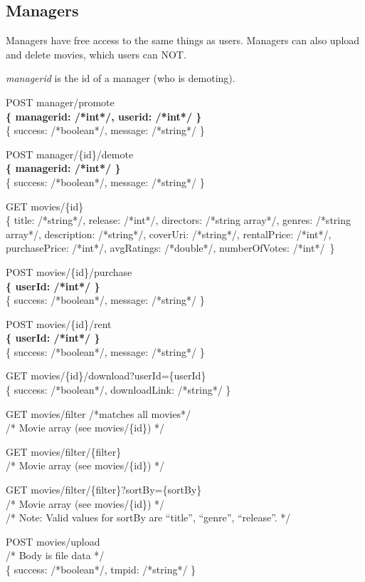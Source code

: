 \subsection{Managers}

Managers have free access to the same things as users. Managers can also upload and delete movies, which users can NOT.

\emph{managerid} is the id of a manager (who is demoting).

POST manager/promote\\
\textbf{\{ managerid: /*int*/, userid: /*int*/ \}} \\
\{ success: /*boolean*/, message: /*string*/ \}

POST manager/\{id\}/demote \\
\textbf{\{ managerid: /*int*/ \}} \\
\{ success: /*boolean*/, message: /*string*/ \}

GET  movies/\{id\} \\
\{ title: /*string*/, release: /*int*/, directors: /*string array*/, genres: /*string array*/, description: /*string*/, coverUri: /*string*/, rentalPrice: /*int*/, purchasePrice: /*int*/, avgRatings: /*double*/, numberOfVotes: /*int*/\ \}

POST movies/\{id\}/purchase \\
\textbf{\{ userId: /*int*/ \}} \\
\{ success: /*boolean*/, message: /*string*/ \}

POST movies/\{id\}/rent \\
\textbf{\{ userId: /*int*/ \}} \\
\{ success: /*boolean*/, message: /*string*/ \}

GET movies/\{id\}/download?userId=\{userId\} \\
\{ success: /*boolean*/, downloadLink: /*string*/ \}

GET  movies/filter /*matches all movies*/ \\
/* Movie array (see movies/\{id\}) */

GET  movies/filter/\{filter\} \\
/* Movie array (see movies/\{id\}) */

GET  movies/filter/\{filter\}?sortBy=\{sortBy\} \\
/* Movie array (see movies/\{id\}) */ \\
/* Note: Valid values for sortBy are “title”, “genre”, “release”. */

POST movies/upload \\
/* Body is file data */ \\
\{ success: /*boolean*/, tmpid: /*string*/ \}


